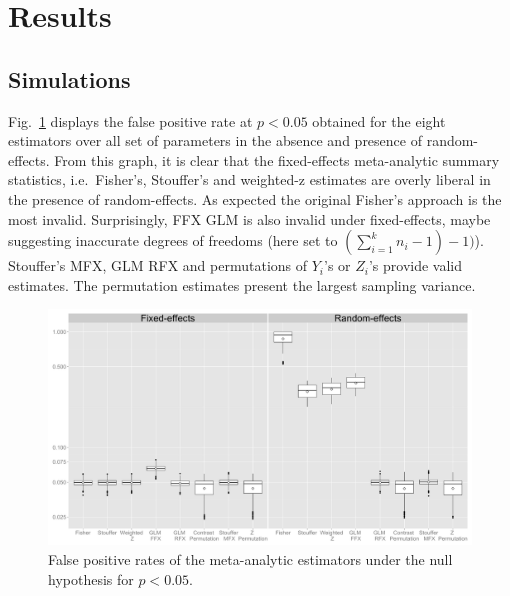\documentclass{llncs}
\newcommand{\effectvector}{Y}
\newcommand{\effect}[1][i]{\effectvector_{#1}}
\newcommand{\zeffect}[1][i]{Z_{#1}}
\newcommand{\nStudies}{k}
\begin{document}
\section{Results}


\subsection{Simulations}
Fig.~\ref{fig_fpr_all} displays the false positive rate at $p<0.05$ obtained for the eight estimators over all set of parameters in the absence and presence of random-effects. From this graph, it is clear that the fixed-effects meta-analytic summary statistics, i.e.\ Fisher's, Stouffer's and weighted-z estimates are overly liberal in the presence of random-effects. As expected the original Fisher's approach is the most invalid. Surprisingly, FFX GLM is also invalid under fixed-effects, maybe suggesting inaccurate degrees of freedoms (here set to $(\sum_{i=1}^\nStudies n_i - 1) - 1)$). Stouffer's MFX, GLM RFX and permutations of $\effect$'s or $\zeffect$'s provide valid estimates. The permutation estimates present the largest sampling variance.

\begin{figure}[ht]
	\centering
	\includegraphics[width=\linewidth]{./Rplot_FPR_all.pdf}
	\caption{False positive rates of the meta-analytic estimators under the null hypothesis for $p<0.05$.}
	\label{fig_fpr_all}
\end{figure}
\end{document}
